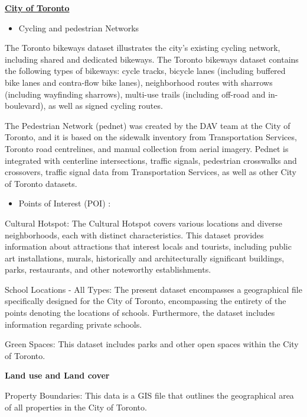 \documentclass[
11pt, %
oneside, %
english, %
singlespacing, %
]{macthesis} %
\def\tightlist{}
\begin{document}
\textbf{\href{https://open.toronto.ca/catalogue/?search=point\&sort=score\%20desc}{City of Toronto}}

\begin{itemize}
\tightlist
\item
  Cycling and pedestrian Networks
\end{itemize}

The Toronto bikeways dataset illustrates the city's existing cycling network, including shared and dedicated bikeways. The Toronto bikeways dataset contains the following types of bikeways: cycle tracks, bicycle lanes (including buffered bike lanes and contra-flow bike lanes), neighborhood routes with sharrows (including wayfinding sharrows), multi-use trails (including off-road and in-boulevard), as well as signed cycling routes.

The Pedestrian Network (pednet) was created by the DAV team at the City of Toronto, and it is based on the sidewalk inventory from Transportation Services, Toronto road centrelines, and manual collection from aerial imagery. Pednet is integrated with centerline intersections, traffic signals, pedestrian crosswalks and crossovers, traffic signal data from Transportation Services, as well as other City of Toronto datasets.

\begin{itemize}
\tightlist
\item
  Points of Interest (POI) :
\end{itemize}

Cultural Hotspot: The Cultural Hotspot covers various locations and diverse neighborhoods, each with distinct characteristics. This dataset provides information about attractions that interest locals and tourists, including public art installations, murals, historically and architecturally significant buildings, parks, restaurants, and other noteworthy establishments.

School Locations - All Types: The present dataset encompasses a geographical file specifically designed for the City of Toronto, encompassing the entirety of the points denoting the locations of schools. Furthermore, the dataset includes information regarding private schools.

Green Spaces: This dataset includes parks and other open spaces within the City of Toronto.

\textbf{Land use and Land cover}

Property Boundaries: This data is a GIS file that outlines the geographical area of all properties in the City of Toronto.
\end{document}
